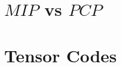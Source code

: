 \documentclass{article}
\begin{document}
\author{Yosef Goren}
\title{}
\maketitle

\section{$MIP$ vs $PCP$}


\section{Tensor Codes}

\end{document}
